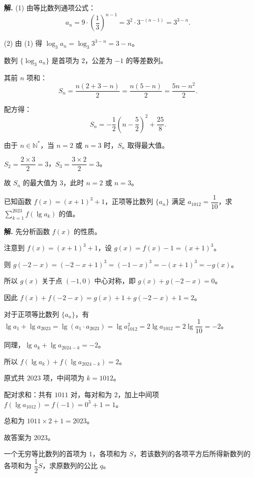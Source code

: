\documentclass[11pt]{ctexrep}
\begin{document}
\textbf{解.} (1) 由等比数列通项公式：
\[
    a_n = 9 \cdot \left(\frac{1}{3}\right)^{n-1} = 3^2 \cdot 3^{-(n-1)} = 3^{3-n}.
\]

(2) 由 (1) 得 $\log_3 a_n = \log_3 3^{3-n} = 3-n$。

数列 $\{\log_3 a_n\}$ 是首项为 $2$，公差为 $-1$ 的等差数列。

其前 $n$ 项和：
\[
    S_n = \frac{n(2 + 3-n)}{2} = \frac{n(5-n)}{2} = \frac{5n - n^2}{2}.
\]

配方得：
\[
    S_n = -\frac{1}{2}\left(n - \frac{5}{2}\right)^2 + \frac{25}{8}.
\]

由于 $n \in \mathbb{N}^*$，当 $n = 2$ 或 $n = 3$ 时，$S_n$ 取得最大值。

$S_2 = \dfrac{2 \times 3}{2} = 3$，$S_3 = \dfrac{3 \times 2}{2} = 3$。

故 $S_n$ 的最大值为 $3$，此时 $n = 2$ 或 $n = 3$。

\begin{realexam}[2023 宝山一模]
    已知函数 $f(x) = (x+1)^3 + 1$，正项等比数列 $\{a_n\}$ 满足 $a_{1012} = \dfrac{1}{10}$，求 $\displaystyle\sum_{k=1}^{2023} f(\lg a_k)$ 的值。
\end{realexam}

\textbf{解.} 先分析函数 $f(x)$ 的性质。

注意到 $f(x) = (x+1)^3 + 1$，设 $g(x) = f(x) - 1 = (x+1)^3$。

则 $g(-2-x) = (-2-x+1)^3 = (-1-x)^3 = -(x+1)^3 = -g(x)$。

所以 $g(x)$ 关于点 $(-1, 0)$ 中心对称，即 $g(x) + g(-2-x) = 0$。

因此 $f(x) + f(-2-x) = g(x) + 1 + g(-2-x) + 1 = 2$。

对于正项等比数列 $\{a_n\}$，有 $\lg a_1 + \lg a_{2023} = \lg(a_1 \cdot a_{2023}) = \lg a_{1012}^2 = 2\lg a_{1012} = 2\lg\dfrac{1}{10} = -2$。

同理，$\lg a_k + \lg a_{2024-k} = -2$。

所以 $f(\lg a_k) + f(\lg a_{2024-k}) = 2$。

原式共 $2023$ 项，中间项为 $k = 1012$。

配对求和：共有 $1011$ 对，每对和为 $2$，加上中间项 $f(\lg a_{1012}) = f(-1) = 0^3 + 1 = 1$。

总和为 $1011 \times 2 + 1 = 2023$。

故答案为 $2023$。

\begin{example}[无穷等比数列求和]
    一个无穷等比数列的首项为 $1$，各项和为 $S$，若该数列的各项平方后所得新数列的各项和为 $\dfrac{1}{2}S$，求原数列的公比 $q$。
\end{example}
\end{document}
